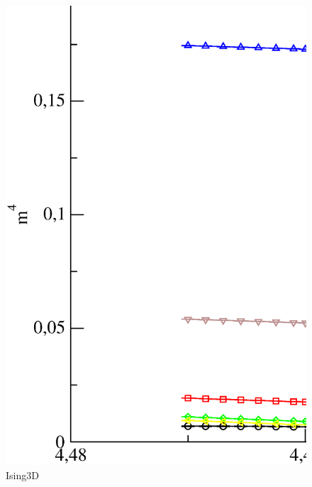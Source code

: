\begin{figure}[!htpb]
  \centering
  \includegraphics[width=15cm]{./plots/Ising3D/Ising3D_M4_vs_Temperature.eps}
  \caption{Ising3D}
\end{figure}

